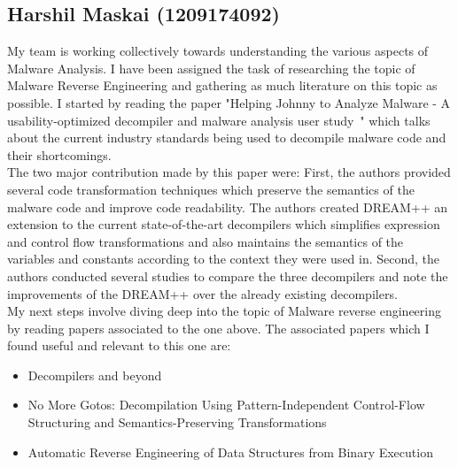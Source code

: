 \documentclass[11pt]{article}
\begin{document}
		\subsection{Harshil Maskai (1209174092)}
		My team is working collectively towards understanding the various aspects of Malware Analysis. I have been assigned the task of researching the topic of Malware Reverse Engineering and gathering as much literature on this topic as possible. I started by reading the paper "Helping Johnny to Analyze Malware - A usability-optimized decompiler and malware analysis user study~\cite{yakdan2016helping}" which talks about the current industry standards being used to decompile malware code and their shortcomings. \\
		The two major contribution made by this paper were:
		First, the authors provided several code transformation techniques which preserve the semantics of the malware code and improve code readability. The authors created DREAM++ an extension to the current state-of-the-art decompilers which simplifies expression and control flow transformations and also maintains the semantics of the variables and constants according to the context they were used in.
		Second, the authors conducted several studies to compare the three decompilers and note the improvements of the DREAM++ over the already existing decompilers.\\
		My next steps involve diving deep into the topic of Malware reverse engineering by reading papers associated to the one above. 
		The associated papers which I found useful and relevant to this one are:
		\begin{itemize}[noitemsep]
			\item{Decompilers and beyond~\cite{guilfanov2008decompilers}}
			\item{No More Gotos: Decompilation Using Pattern-Independent Control-Flow Structuring and Semantics-Preserving Transformations~\cite{yakdan2015no}}
			\item{Automatic Reverse Engineering of Data Structures from Binary Execution~\cite{lin2010automatic}}
		\end{itemize}
		
\end{document}
